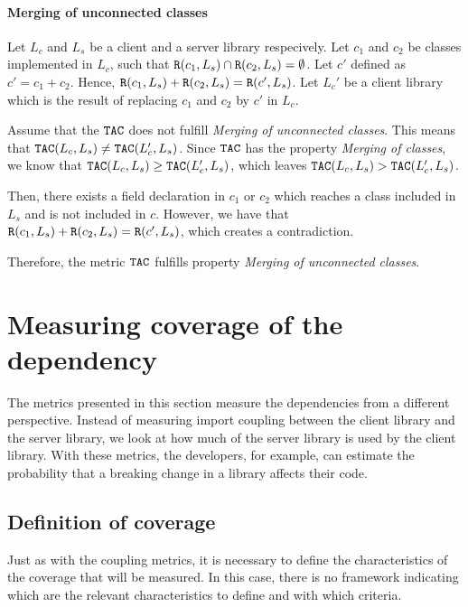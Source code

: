 \paragraph{Merging of unconnected classes}
Let $L_c$ and $L_s$ be a client and a server library respecively. Let $c_1$ and $c_2$ be classes implemented in $L_c$, such that $\verb|R|(c_1, L_s) \cap \verb|R|(c_2, L_s) = \emptyset$. Let $c'$ defined as $c' = c_1 + c_2$. Hence, $\verb|R|(c_1, L_s) + \verb|R|(c_2, L_s) = \verb|R|(c', L_s)$. Let $L_c'$ be a client library which is the result of replacing $c_1$ and $c_2$ by $c'$ in $L_c$.

Assume that the $\verb|TAC|$ does not fulfill \textit{Merging of unconnected classes}. This means that $\verb|TAC|(L_c, L_s) \neq \verb|TAC|(L_c', L_s)$. Since $\verb|TAC|$ has the property \textit{Merging of classes}, we know that $\verb|TAC|(L_c, L_s) \geq \verb|TAC|(L_c', L_s)$, which leaves $\verb|TAC|(L_c, L_s) > \verb|TAC|(L_c', L_s)$.

Then, there exists a field declaration in $c_1$ or $c_2$ which reaches a class included in $L_s$ and is not included in $c$. However, we have that $\verb|R|(c_1, L_s) + \verb|R|(c_2, L_s) = \verb|R|(c', L_s)$, which creates a contradiction.

Therefore, the metric $\verb|TAC|$ fulfills property \textit{Merging of unconnected classes}.

\section{Measuring coverage of the dependency}\label{sec:coverageMetrics}
The metrics presented in this section measure the dependencies from a different perspective. Instead of measuring import coupling between the client library and the server library, we look at how much of the server library is used by the client library. With these metrics, the developers, for example, can estimate the probability that a breaking change in a library affects their code.

\subsection{Definition of coverage}\label{subsect:usage-definition}
Just as with the coupling metrics, it is necessary to define the characteristics of the coverage that will be measured. In this case, there is no framework indicating which are the relevant characteristics to define and with which criteria.

